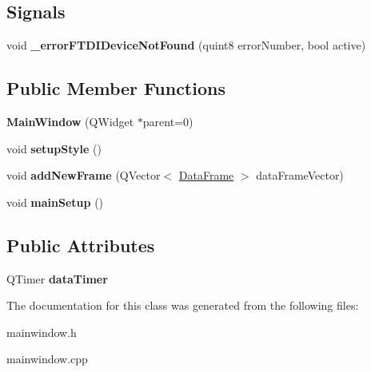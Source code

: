 \subsection*{Signals}
\begin{DoxyCompactItemize}
\item 
\mbox{\label{class_main_window_a7fb16a56a5bdc289ebee60e0d3958a9d}} 
void {\bfseries \+\_\+error\+F\+T\+D\+I\+Device\+Not\+Found} (quint8 error\+Number, bool active)
\end{DoxyCompactItemize}
\subsection*{Public Member Functions}
\begin{DoxyCompactItemize}
\item 
\mbox{\label{class_main_window_a8b244be8b7b7db1b08de2a2acb9409db}} 
{\bfseries Main\+Window} (Q\+Widget $\ast$parent=0)
\item 
\mbox{\label{class_main_window_a143e270946cc75c8b6ab9f44e260b515}} 
void {\bfseries setup\+Style} ()
\item 
\mbox{\label{class_main_window_aadbb2583bcb8abf2053763b137950c21}} 
void {\bfseries add\+New\+Frame} (Q\+Vector$<$ \hyperlink{class_data_frame}{Data\+Frame} $>$ data\+Frame\+Vector)
\item 
\mbox{\label{class_main_window_abeb0ce89e46a2a9312ccc2e19247c83b}} 
void {\bfseries main\+Setup} ()
\end{DoxyCompactItemize}
\subsection*{Public Attributes}
\begin{DoxyCompactItemize}
\item 
\mbox{\label{class_main_window_a2c87ed89832cc91aba5eaaae189101d3}} 
Q\+Timer {\bfseries data\+Timer}
\end{DoxyCompactItemize}


The documentation for this class was generated from the following files\+:\begin{DoxyCompactItemize}
\item 
mainwindow.\+h\item 
mainwindow.\+cpp\end{DoxyCompactItemize}
